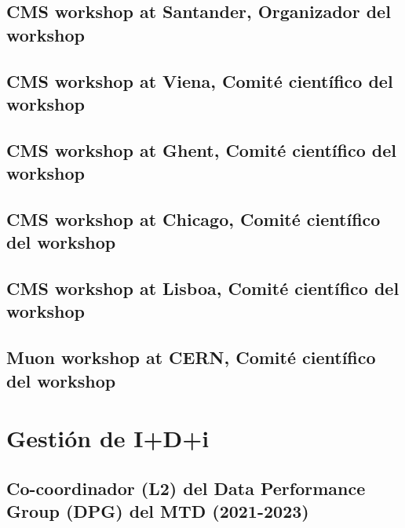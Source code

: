 \documentclass[a4paper, 11pt, twoside, openright]{report}
\begin{document}
\subsection{CMS workshop at Santander, Organizador del workshop}


\subsection{CMS workshop at Viena, Comité científico del workshop}


\subsection{CMS workshop at Ghent, Comité científico del workshop}


\subsection{CMS workshop at Chicago, Comité científico del workshop}


\subsection{CMS workshop at Lisboa, Comité científico del workshop}

\subsection{Muon workshop at CERN, Comité científico del workshop}


\section{Gestión de I+D+i}

\subsection{Co-coordinador (L2) del Data Performance Group (DPG) del MTD (2021-2023)}

\end{document}

